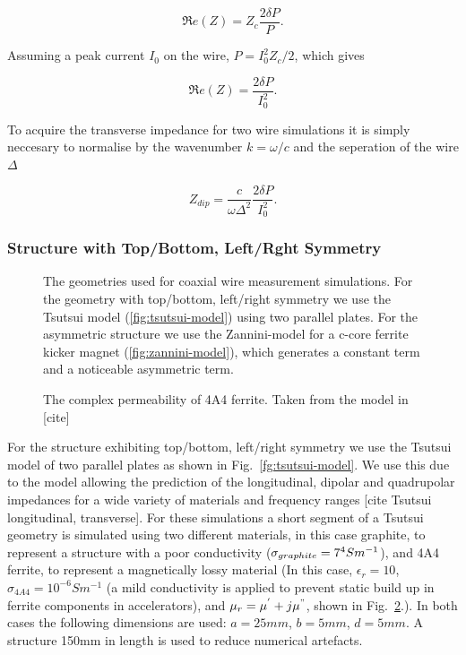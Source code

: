 \begin{equation}
\Re{}e \left( Z \right) = Z_{c} \frac{2 \delta P}{P}.
\end{equation}

Assuming a peak current $I_{0}$ on the wire, $P = I_{0}^{2}Z_{c}/2$, which gives

\begin{equation}
\Re{}e \left( Z \right) = \frac{2 \delta P}{I_{0}^{2}}.
\end{equation}

To acquire the transverse impedance for two wire simulations it is simply neccesary to normalise by the wavenumber $k=\omega / c$ and the seperation of the wire $\Delta$ 

\begin{equation}
Z_{dip} = \frac{c}{\omega \Delta^{2}} \frac{2 \delta P}{I_{0}^{2}}.
\end{equation}

\subsubsection{Structure with Top/Bottom, Left/Rght Symmetry}

\begin{figure}
\subfigure[]{
\label{fig:tsutsui-model}
}

\subfigure[]{

\label{fig:zannini-model}
}
\label{fig:wire-measure-geometries}
\caption{The geometries used for coaxial wire measurement simulations. For the geometry with top/bottom, left/right symmetry we use the Tsutsui model (\ref{fig:tsutsui-model}) using two parallel plates. For the asymmetric structure we use the Zannini-model for a c-core ferrite kicker magnet (\ref{fig:zannini-model}), which generates a constant term and a noticeable asymmetric term.}
\end{figure}

\begin{figure}
\label{fig:4a4-permeability}
\caption{The complex permeability of 4A4 ferrite. Taken from the model in [cite]}
\end{figure}

For the structure exhibiting top/bottom, left/right symmetry we use the Tsutsui model of two parallel plates as shown in Fig.~\ref{fg:tsutsui-model}. We use this due to the model allowing the prediction of the longitudinal, dipolar and quadrupolar impedances for a wide variety of materials and frequency ranges [cite Tsutsui longitudinal, transverse]. For these simulations a short segment of a Tsutsui geometry is simulated using two different materials, in this case graphite, to represent a structure with a poor conductivity ($\sigma_{graphite} = 7 \time 10^{4} S m^{-1}$), and 4A4 ferrite, to represent a magnetically lossy material (In this case, $\epsilon_{r} = 10$, $\sigma_{4A4} = 10^{-6} S m^{-1}$ (a mild conductivity is applied to prevent static build up in ferrite components in accelerators), and $\mu_{r} = \mu^{'} + j \mu^{"}$, shown in Fig.~\ref{fig:4a4-permeability}.). In both cases the following dimensions are used: $a=25mm$, $b=5mm$, $d=5mm$. A structure 150mm in length is used to reduce numerical artefacts.

